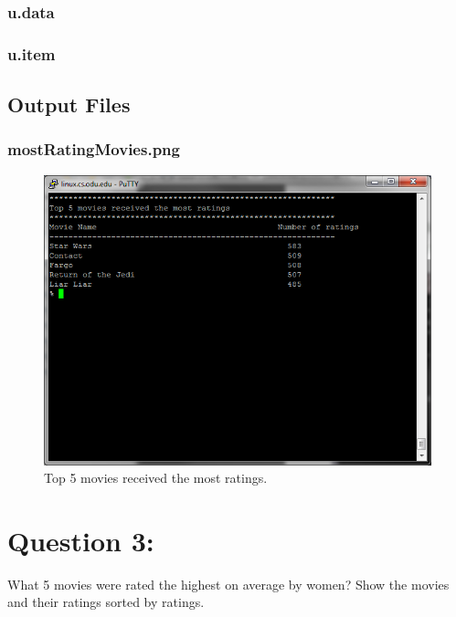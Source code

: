 \documentclass[12pt]{article}
\begin{document}
\subsubsection{u.data}

\subsubsection{u.item}

\newpage

\subsection{Output Files}
\subsubsection{mostRatingMovies.png}
\begin{figure}[ht]
\includegraphics[scale=1.0]{../Q2/mostRatingMovies}
\centering
\caption{Top 5 movies received the most ratings.}
\label{fig:mostRatingMovies}
\end{figure}
\newpage

\section{Question 3:}
What 5 movies were rated the highest on average by women? Show
the movies and their ratings sorted by ratings.
\end{document}
